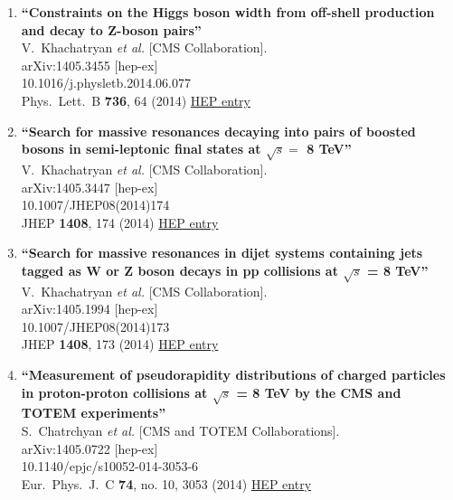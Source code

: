 \documentclass{article}
\begin{document}
\begin{enumerate}
\item%
{\bf ``Constraints on the Higgs boson width from off-shell production and decay to Z-boson pairs''}
  \\{}V.~Khachatryan {\it et al.} [CMS Collaboration].
  \\{}arXiv:1405.3455 [hep-ex]
    \\{}10.1016/j.physletb.2014.06.077
\\{}Phys.\ Lett.\ B {\bf 736}, 64 (2014) %
\href{http://inspirehep.net/record/1296082}{HEP entry}


\item%
{\bf ``Search for massive resonances decaying into pairs of boosted bosons in semi-leptonic final states at $\sqrt{s} =$ 8 TeV''}
  \\{}V.~Khachatryan {\it et al.} [CMS Collaboration].
  \\{}arXiv:1405.3447 [hep-ex]
    \\{}10.1007/JHEP08(2014)174
\\{}JHEP {\bf 1408}, 174 (2014) %
\href{http://inspirehep.net/record/1296080}{HEP entry}


\item%
{\bf ``Search for massive resonances in dijet systems containing jets tagged as W or Z boson decays in pp collisions at $ \sqrt{s} $ = 8 TeV''}
  \\{}V.~Khachatryan {\it et al.} [CMS Collaboration].
  \\{}arXiv:1405.1994 [hep-ex]
    \\{}10.1007/JHEP08(2014)173
\\{}JHEP {\bf 1408}, 173 (2014) %
\href{http://inspirehep.net/record/1294937}{HEP entry}


\item%
{\bf ``Measurement of pseudorapidity distributions of charged particles in proton-proton collisions at $\sqrt{s}$ = 8 TeV by the CMS and TOTEM experiments''}
  \\{}S.~Chatrchyan {\it et al.} [CMS and TOTEM Collaborations].
  \\{}arXiv:1405.0722 [hep-ex]
    \\{}10.1140/epjc/s10052-014-3053-6
\\{}Eur.\ Phys.\ J.\ C {\bf 74}, no. 10, 3053 (2014) %
\href{http://inspirehep.net/record/1294140}{HEP entry}



\end{enumerate}
\end{document}
